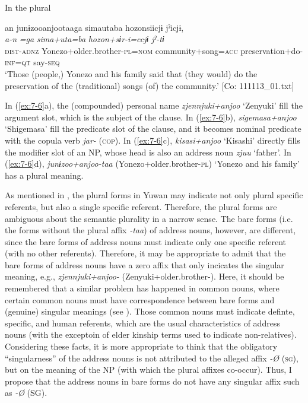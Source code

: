 \ex \label{ex:7:6d}In the plural

{\TM}
\glll an  junɨzooanjootaaga  simautaba hozonsiicjɨ  jˀicjɨ,\\
\textit{a-n}  \textit{=ga}  \textit{sima+uta=ba}  \textit{hozon+sɨr-i=ccjɨ}  \textit{jˀ-tɨ}\\
      \textsc{dist}-\textsc{adnz}  Yonezo+older.brother-\textsc{pl}=\textsc{nom}  community+song=\textsc{acc}         preservation+do-\textsc{inf}=\textsc{qt}  say-\textsc{seq}\\
\glt    ‘Those (people,) Yonezo and his family said that (they would) do the preservation of the (traditional) songs (of) the community.’      [Co: 111113\_01.txt]

  \z
\z

In (\ref{ex:7-6}a), the (compounded) personal name \textit{zjennjuki+anjoo} ‘Zenyuki’ fill the argument slot, which is the subject of the clause. In (\ref{ex:7-6}b), \textit{sigemasa+anjoo} ‘Shigemasa’ fill the predicate slot of the clause, and it becomes nominal predicate with the copula verb \textit{jar-} (\textsc{cop}). In (\ref{ex:7-6}c), \textit{kisasi+anjoo} ‘Kisashi’ directly fills the modifier slot of an NP, whose head is also an address noun \textit{zjuu} ‘father’. In (\ref{ex:7-6}d), \textit{junɨzoo+anjoo-taa} (Yonezo+older.brother-\textsc{pl}) ‘Yonezo and his family’ has a plural meaning.

  As mentioned in , the plural forms in Yuwan may indicate not only plural specific referents, but also a single specific referent. Therefore, the plural forms are ambiguous about the semantic plurality in a narrow sense. The bare forms (i.e. the forms without the plural affix \textit{{}-taa}) of address nouns, however, are different, since the bare forms of address nouns must indicate only one specific referent (with no other referents). Therefore, it may be appropriate to admit that the bare forms of address nouns have a zero affix that only incicates the singular meaning, e.g., \textit{zjennjuki+anjoo-} (Zenyuki+older.brother-\textsc{}). Here, it should be remembered that a similar problem has happened in common nouns, where certain common nouns must have correspondence between bare forms and (genuine) singular meanings (see ). Those common nouns must indicate definte, specific, and human referents, which are the usual characteristics of address nouns (with the exceptoin of elder kinship terms used to indicate non-relatives). Considering these facts, it is more appropriate to think that the obligatory “singularness” of the address nouns is not attributed to the alleged affix \textit{{}-Ø} (\textsc{sg}), but on the meaning of the NP (with which the plural affixes co-occur). Thus, I propose that the address nouns in bare forms do not have any singular affix such as \textit{{}-Ø} (SG).

